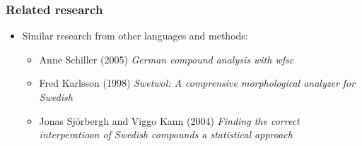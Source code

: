 \documentclass[xetex]{beamer}
\begin{document}
\begin{frame}
\frametitle{Related research}
\begin{itemize}
\item Similar research from other languages and methods:
\begin{itemize}
\item Anne Schiller (2005) \emph{German compound analysis with \emph{wfsc}}
\item Fred Karlsson (1998) \emph{Swetwol: A comprensive morphological analyzer for Swedish}
\item Jonas Sjörbergh and Viggo Kann (2004) \emph{Finding the correct interperatioon of Swedish compounds a statistical approach}
\end{itemize}
\end{itemize}
\end{frame}
\end{document}

